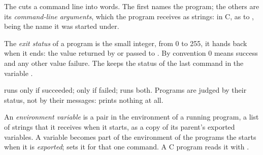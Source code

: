 
\begin{definition}\label{def:b1:the-shell:argument}
The  cuts a command line into words. The first names the program; the others are its \emph{command-line
arguments}, which the program receives as strings: in C, as  to
,  being the name it was started under.
\end{definition}

\begin{definition}\label{def:b1:the-shell:exit-status}
The \emph{exit status} of a program is the small integer, from 0 to 255, it hands back when it ends:
the value returned by  or passed to . By convention 0 means success and any other value failure.
The  keeps the status of the last command in the variable .
\end{definition}

\label{out:b1:the-shell:status}

 runs  only if  succeeded;  only if  failed;  runs both.
Programs are judged by their status, not by their messages:  prints nothing at all.

\begin{definition}\label{def:b1:the-shell:environment}
An \emph{environment variable} is a pair  in the environment of a running
program, a list of strings that it receives when it starts, as a copy of its parent's exported variables. A 
variable becomes part of the environment of the programs the  starts when it is \emph{exported};  sets it for that one command. A C program reads it with .
\end{definition}

\label{lst:b1:the-shell:env-child}

